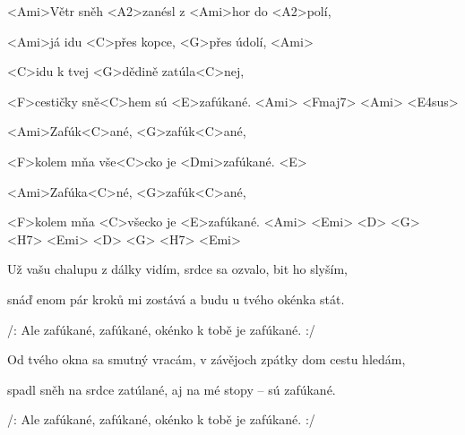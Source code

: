 





\zs
<Ami>Větr sněh <A2>zanésl z <Ami>hor do <A2>polí,

<Ami>já idu <C>přes kopce, <G>přes údolí, <Ami>

<C>idu k tvej <G>dědině zatúla<C>nej,

<F>cestičky sně<C>hem sú <E>zafúkané. <Ami> <Fmaj7> 
<Ami> <E4sus>
\ks

\zr
<Ami>Zafúk<C>ané, <G>zafúk<C>ané,

<F>kolem mňa vše<C>cko je <Dmi>zafúkané. <E>

<Ami>Zafúka<C>né, <G>zafúk<C>ané,

<F>kolem mňa <C>všecko je <E>zafúkané. <Ami> <Emi> 
<D> <G> <H7> <Emi> <D> <G> <H7> <Emi>
\kr

\zs
Už vašu chalupu z dálky vidím, srdce sa ozvalo, bit ho slyším,

snáď enom pár kroků mi zostává a budu u tvého okénka stát.
\ks

\zr
/: Ale zafúkané, zafúkané, okénko k tobě je zafúkané. :/
\kr

\zs
Od tvého okna sa smutný vracám, v závějoch zpátky dom cestu hledám,

spadl sněh na srdce zatúlané, aj na mé stopy -- sú zafúkané.
\ks

\zr
/: Ale zafúkané, zafúkané, okénko k tobě je zafúkané. :/
\kr







\kp
